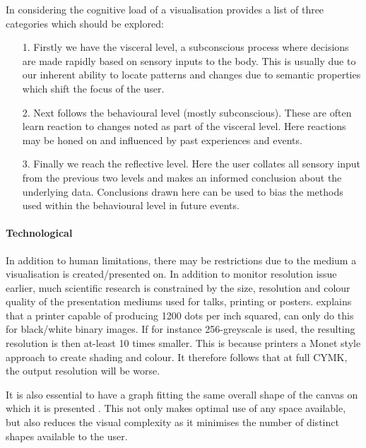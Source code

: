 In considering the cognitive load of a visualisation \citep{emotional} provides a list of three categories which should be explored:


\begin{itemize}
\item[1.] Firstly we have the visceral level, a subconscious process where decisions are made rapidly based on sensory inputs to the body. 
This is usually due to our inherent ability to locate patterns and changes due to semantic properties which shift the focus of the user.  

\item[2.] Next follows the behavioural level (mostly subconscious). These are often learn reaction to changes noted as part of the visceral level. Here reactions may be honed on and influenced by past experiences and events. 

\item[3.] Finally we reach the reflective level. Here the user collates all sensory input from the previous two levels and makes an informed conclusion about the underlying data. Conclusions drawn here can be used to bias the methods used within the behavioural level in future events. 
\end{itemize}

\paragraph*{Technological}
In addition to human limitations, there may be restrictions due to the medium a visualisation is created/presented on. In addition to monitor resolution issue earlier, much scientific research is constrained by the size, resolution and colour quality of the presentation mediums used for talks, printing or posters. \citep{ware} explains that a printer capable of producing 1200 dots per inch squared, can only do this for black/white binary images. If for instance 256-greyscale is used, the resulting resolution is then at-least 10 times smaller. This is because printers a Monet style approach to create shading and colour. It therefore follows that at full CYMK, the output resolution will be worse. 

It is also essential to have a graph fitting the same overall shape of the canvas on which it is presented \citep{graphmetnew}. This not only makes optimal use of any space available, but also reduces the visual complexity as it minimises the number of distinct shapes available to the user. 




